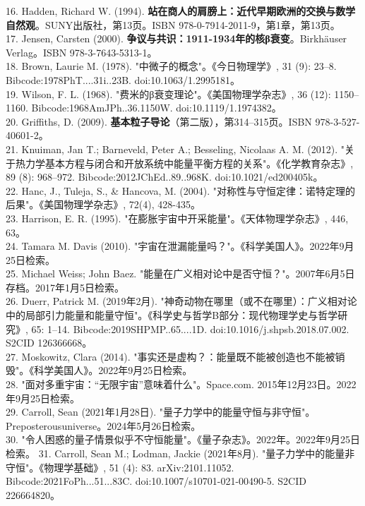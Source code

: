 16. Hadden, Richard W. (1994). \textbf{站在商人的肩膀上：近代早期欧洲的交换与数学自然观}。SUNY出版社，第13页。ISBN 978-0-7914-2011-9，第1章，第13页。\\
17. Jensen, Carsten (2000). \textbf{争议与共识：1911-1934年的核β衰变}。Birkhäuser Verlag。ISBN 978-3-7643-5313-1。\\
18. Brown, Laurie M. (1978). "中微子的概念"。《今日物理学》, 31 (9): 23–8. Bibcode:1978PhT....31i..23B. doi:10.1063/1.2995181。\\
19. Wilson, F. L. (1968). "费米的β衰变理论"。《美国物理学杂志》, 36 (12): 1150–1160. Bibcode:1968AmJPh..36.1150W. doi:10.1119/1.1974382。\\
20. Griffiths, D. (2009). \textbf{基本粒子导论}（第二版），第314–315页。ISBN 978-3-527-40601-2。\\
21. Knuiman, Jan T.; Barneveld, Peter A.; Besseling, Nicolaas A. M. (2012). "关于热力学基本方程与闭合和开放系统中能量平衡方程的关系"。《化学教育杂志》, 89 (8): 968–972. Bibcode:2012JChEd..89..968K. doi:10.1021/ed200405k。\\
22. Hanc, J., Tuleja, S., & Hancova, M. (2004). "对称性与守恒定律：诺特定理的后果"。《美国物理学杂志》, 72(4), 428-435。\\
23. Harrison, E. R. (1995). "在膨胀宇宙中开采能量"。《天体物理学杂志》, 446, 63。\\
24. Tamara M. Davis (2010). "宇宙在泄漏能量吗？"。《科学美国人》。2022年9月25日检索。\\
25. Michael Weiss; John Baez. "能量在广义相对论中是否守恒？"。2007年6月5日存档。2017年1月5日检索。\\
26. Duerr, Patrick M. (2019年2月). "神奇动物在哪里（或不在哪里）：广义相对论中的局部引力能量和能量守恒"。《科学史与哲学B部分：现代物理学史与哲学研究》, 65: 1–14. Bibcode:2019SHPMP..65....1D. doi:10.1016/j.shpsb.2018.07.002. S2CID 126366668。\\
27. Moskowitz, Clara (2014). "事实还是虚构？：能量既不能被创造也不能被销毁"。《科学美国人》。2022年9月25日检索。\\
28. "面对多重宇宙：“无限宇宙”意味着什么"。Space.com. 2015年12月23日。2022年9月25日检索。\\
29. Carroll, Sean (2021年1月28日). "量子力学中的能量守恒与非守恒"。Preposterousuniverse。2024年5月26日检索。\\
30. "令人困惑的量子情景似乎不守恒能量"。《量子杂志》。2022年。2022年9月25日检索。
31. Carroll, Sean M.; Lodman, Jackie (2021年8月). "量子力学中的能量非守恒"。《物理学基础》, 51 (4): 83. arXiv:2101.11052. Bibcode:2021FoPh...51...83C. doi:10.1007/s10701-021-00490-5. S2CID 226664820。\\
